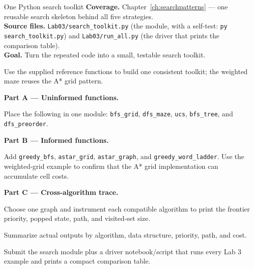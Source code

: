 
\begin{labproject}{One Python search toolkit}
\textbf{Coverage.} Chapter~\ref{ch:searchpatterns} --- one reusable search skeleton behind all five strategies.\\
\textbf{Source files.} \texttt{Lab03/search\_toolkit.py} (the module, with a self-test: \texttt{py search\_toolkit.py}) and \texttt{Lab03/run\_all.py} (the driver that prints the comparison table).\\
\textbf{Goal.} Turn the repeated code into a small, testable search toolkit.

\begin{labmode}
Use the supplied reference functions to build one consistent toolkit; the weighted maze reuses the A* grid pattern.
\end{labmode}

\medskip\noindent\textbf{Part A --- Uninformed functions.}\par
Place the following in one module: \texttt{bfs\_grid}, \texttt{dfs\_maze}, \texttt{ucs}, \texttt{bfs\_tree}, and \texttt{dfs\_preorder}.

\medskip\noindent\textbf{Part B --- Informed functions.}\par
Add \texttt{greedy\_bfs}, \texttt{astar\_grid}, \texttt{astar\_graph}, and \texttt{greedy\_word\_ladder}. Use the weighted-grid example to confirm that the A* grid implementation can accumulate cell costs.

\medskip\noindent\textbf{Part C --- Cross-algorithm trace.}\par
Choose one graph and instrument each compatible algorithm to print the frontier priority, popped state, path, and visited-set size.

\begin{tryit}
Summarize actual outputs by algorithm, data structure, priority, path, and cost.
\end{tryit}
\end{labproject}

\begin{labdeliverable}
Submit the search module plus a driver notebook/script that runs every Lab 3 example and prints a compact comparison table.
\end{labdeliverable}
